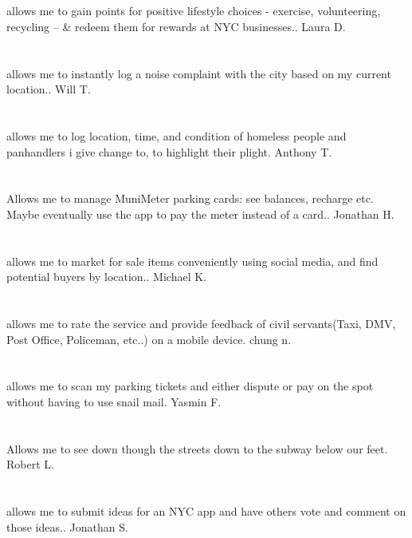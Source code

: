 \section{}allows me to gain points for positive lifestyle choices - exercise,  volunteering,  recycling --  \& redeem them for rewards at NYC businesses.. Laura D.
\section{}allows me to instantly log a noise complaint with the city based on my current location.. Will T.
\section{} allows me to log location,  time,  and condition of homeless people and panhandlers i give change to,  to highlight their plight. Anthony T.
\section{}Allows me to manage MuniMeter parking cards: see balances,  recharge etc. Maybe eventually use the app to pay the meter instead of a card.. Jonathan H.
\section{}allows me to market for sale items conveniently using social media,  and find potential buyers by location.. Michael K.
\section{}allows me to rate the service and provide feedback of civil servants(Taxi,  DMV,  Post Office,  Policeman,  etc..) on a mobile device. chung n.
\section{}allows me to scan my parking tickets and either dispute or pay on the spot without having to use snail mail. Yasmin F.
\section{}Allows me to see down though the streets down to the subway below our feet. Robert L.
\section{}allows me to submit ideas for an NYC app and have others vote and comment on those ideas.. Jonathan S.
